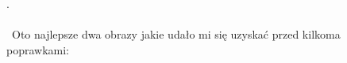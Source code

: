 \documentclass{article}
\begin{document}
\begin{figure}[H]
  \centering
  \hfill
\end{figure}
.\\\\\
Oto najlepsze dwa obrazy jakie udało mi się uzyskać przed kilkoma poprawkami:
\end{document}
